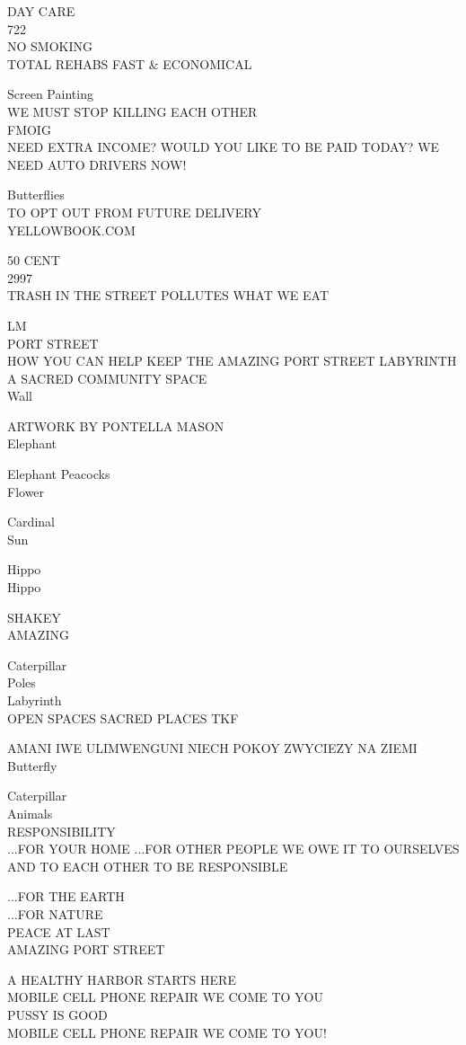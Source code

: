 \documentclass[10pt,letterpaper]{article}
\begin{document}
DAY CARE\\
722\\
NO SMOKING\\
TOTAL REHABS FAST \& ECONOMICAL

Screen Painting\\
WE MUST STOP KILLING EACH OTHER\\
FMOIG\\
NEED EXTRA INCOME?  WOULD YOU LIKE TO BE PAID TODAY?  WE NEED AUTO DRIVERS NOW!

Butterflies\\
TO OPT OUT FROM FUTURE DELIVERY\\
YELLOWBOOK.COM

50 CENT\\
2997\\
TRASH IN THE STREET POLLUTES WHAT WE EAT

LM\\
PORT STREET\\
HOW YOU CAN HELP KEEP THE AMAZING PORT STREET LABYRINTH A SACRED COMMUNITY SPACE\\
Wall

ARTWORK BY PONTELLA MASON\\
Elephant

Elephant Peacocks\\
Flower

Cardinal\\
Sun

Hippo\\
Hippo

SHAKEY\\
AMAZING

Caterpillar\\
Poles\\
Labyrinth\\
OPEN SPACES SACRED PLACES TKF

AMANI IWE ULIMWENGUNI NIECH POKOY ZWYCIEZY NA ZIEMI\\
Butterfly

Caterpillar\\
Animals\\
RESPONSIBILITY\\
...FOR YOUR HOME ...FOR OTHER PEOPLE WE OWE IT TO OURSELVES AND TO EACH OTHER TO BE RESPONSIBLE

...FOR THE EARTH\\
...FOR NATURE\\
PEACE AT LAST\\
AMAZING PORT STREET

A HEALTHY HARBOR STARTS HERE\\
MOBILE CELL PHONE REPAIR WE COME TO YOU\\
PUSSY IS GOOD\\
MOBILE CELL PHONE REPAIR WE COME TO YOU!
\end{document}
